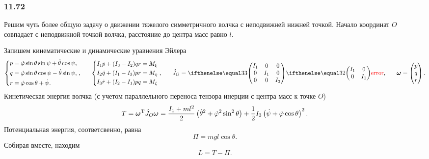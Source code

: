 \subsubsection*{11.72}

Решим чуть более общую задачу о движении тяжелого симметричного волчка с неподвижней нижней точкой. Начало координат $O$ совпадает с неподвижной точкой волчка, расстояние до центра масс равно $l$. 

Запишем кинематические и динамические уравнения Эйлера
\begin{equation*}
    \left\{\begin{aligned}
        p &= \dot{\varphi} \sin \theta \sin \psi + \dot{\theta} \cos \psi,\\
        q &= \dot{\varphi} \sin \theta \cos \psi - \dot{\theta} \sin \psi,\\
        r &= \dot{\varphi} \cos \theta + \dot{\psi}.
    \end{aligned}\right.,
    \hspace{0.6cm} 
    \left\{\begin{aligned}
        I_1 \dot{p} + (I_3-I_2) q r &= M_{\xi} \\
        I_2 \dot{q} + (I_1-I_3) p r &= M_{\eta} \\
        I_3 \dot{r} + (I_2-I_1) p q &= M_{\zeta} \\
    \end{aligned}\right.,   
    \hspace{0.6cm} 
    \hat{J}_O = \dmat{3}{I_1}{I_1}{I_3}, \hspace{0.6cm} 
    \vc{\omega} = \begin{pmatrix}
        p \\ q \\ r
    \end{pmatrix}.
\end{equation*}
Кинетическая энергия волчка (с учетом параллельного переноса тензора инерции с центра масс к точке $O$)
\begin{equation*}
    T = \mbox{\boldmath $\omega$}^{\text{T}} \hat{J}_O \mbox{\boldmath $\omega$} = 
    \frac{I_1+ml^2}{2} \left(\dot{\theta}^2+\dot{\varphi}^2\sin^2 \theta\right) + \frac{1}{2} I_3 \left(\dot{\psi}+ \dot{\varphi} \cos \theta \right)^2.
\end{equation*}
Потенциальная энергия, соответсвенно, равна
\begin{equation*}
    \Pi = mgl \cos \theta.
\end{equation*}
Собирая вместе, находим
\begin{equation*}
    L = T - \Pi.
\end{equation*}
